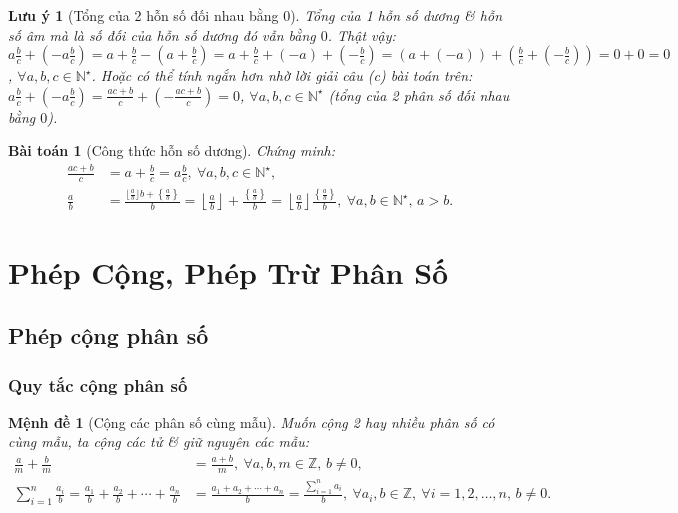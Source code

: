 \documentclass{article}
\newtheorem{baitoan}{Bài toán}
\newtheorem{luuy}{Lưu ý}
\newtheorem{menhde}{Mệnh đề}
\begin{document}
\begin{luuy}[Tổng của 2 hỗn số đối nhau bằng $0$]
	Tổng của 1 hỗn số dương \& hỗn số âm mà là số đối của hỗn số dương đó vẫn bằng $0$. Thật vậy: $a\frac{b}{c} + \left(-a\frac{b}{c}\right) = a + \frac{b}{c} - \left(a + \frac{b}{c}\right) = a + \frac{b}{c} + (-a) + \left(-\frac{b}{c}\right) = (a + (-a)) + \left(\frac{b}{c} + \left(-\frac{b}{c}\right)\right) = 0 + 0 = 0$, $\forall a,b,c\in\mathbb{N}^\star$. Hoặc có thể tính ngắn hơn nhờ lời giải câu (c) bài toán trên: $a\frac{b}{c} + \left(-a\frac{b}{c}\right) = \frac{ac + b}{c} +\left(-\frac{ac + b}{c}\right) = 0$, $\forall a,b,c\in\mathbb{N}^\star$ (tổng của 2 phân số đối nhau bằng $0$).
\end{luuy}

\begin{baitoan}[Công thức hỗn số dương]
	Chứng minh:
	\begin{align*}
		\frac{ac + b}{c} &= a + \frac{b}{c} = a\frac{b}{c},\ \forall a,b,c\in\mathbb{N}^\star,\\
		\frac{a}{b} &= \frac{\lfloor\frac{a}{b}\rfloor b + \left\{\frac{a}{b}\right\}}{b} = \left\lfloor\frac{a}{b}\right\rfloor + \frac{\left\{\frac{a}{b}\right\}}{b} = \left\lfloor\frac{a}{b}\right\rfloor\frac{\left\{\frac{a}{b}\right\}}{b},\ \forall a,b\in\mathbb{N}^\star,\, a > b.
	\end{align*}
\end{baitoan}


\section{Phép Cộng, Phép Trừ Phân Số}

\subsection{Phép cộng phân số}

\subsubsection{Quy tắc cộng phân số}

\begin{menhde}[Cộng các phân số cùng mẫu]
	Muốn cộng 2 hay nhiều phân số có cùng mẫu, ta cộng các tử \& giữ nguyên các mẫu:
	\begin{align*}
		\frac{a}{m} + \frac{b}{m} &= \frac{a + b}{m},\ \forall a,b,m\in\mathbb{Z},\,b\ne0,\\
		\sum_{i=1}^n \frac{a_i}{b} = \frac{a_1}{b} + \frac{a_2}{b} + \cdots + \frac{a_n}{b} &= \frac{a_1 + a_2 + \cdots + a_n}{b} = \frac{\sum_{i=1}^n a_i}{b},\ \forall a_i,b\in\mathbb{Z},\ \forall i = 1,2,\ldots,n,\,b\ne0.
	\end{align*}
\end{menhde}
\end{document}
